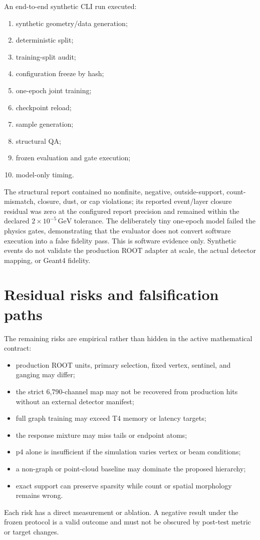 \documentclass[10pt,a4paper]{article}
\newcommand{\GeV}{\,\mathrm{GeV}}
\begin{document}
An end-to-end synthetic CLI run executed:
\begin{enumerate}
\item synthetic geometry/data generation;
\item deterministic split;
\item training-split audit;
\item configuration freeze by hash;
\item one-epoch joint training;
\item checkpoint reload;
\item sample generation;
\item structural QA;
\item frozen evaluation and gate execution;
\item model-only timing.
\end{enumerate}
The structural report contained no nonfinite, negative, outside-support, count-mismatch, closure, dust, or cap violations; its reported event/layer closure residual was zero at the configured report precision and remained within the declared $2\times10^{-5}\GeV$ tolerance. The deliberately tiny one-epoch model failed the physics gates, demonstrating that the evaluator does not convert software execution into a false fidelity pass. This is software evidence only. Synthetic events do not validate the production ROOT adapter at scale, the actual detector mapping, or Geant4 fidelity.

\section{Residual risks and falsification paths}

The remaining risks are empirical rather than hidden in the active mathematical contract:
\begin{itemize}
\item production ROOT units, primary selection, fixed vertex, sentinel, and ganging may differ;
\item the strict 6,790-channel map may not be recovered from production hits without an external detector manifest;
\item full graph training may exceed T4 memory or latency targets;
\item the response mixture may miss tails or endpoint atoms;
\item p4 alone is insufficient if the simulation varies vertex or beam conditions;
\item a non-graph or point-cloud baseline may dominate the proposed hierarchy;
\item exact support can preserve sparsity while count or spatial morphology remains wrong.
\end{itemize}
Each risk has a direct measurement or ablation. A negative result under the frozen protocol is a valid outcome and must not be obscured by post-test metric or target changes.
\end{document}
